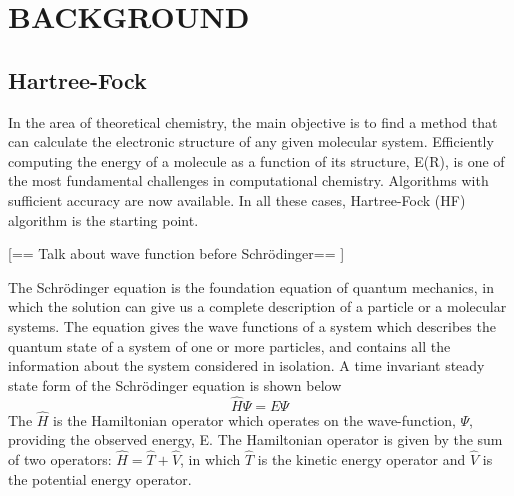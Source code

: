 \documentclass[twoside]{article}
\begin{document}

\section{BACKGROUND}

\subsection{Hartree-Fock}



In the area of theoretical chemistry, the main objective is to find a method that can calculate the electronic structure of any given molecular system. Efficiently computing the energy of a molecule as a function of its structure, E(R), is one of the most fundamental challenges in computational chemistry. Algorithms with sufficient accuracy are now available. In all these cases, Hartree-Fock (HF) algorithm is the starting point.



[== Talk about wave function before Schrödinger== ]

The Schrödinger equation is the foundation equation of quantum mechanics, in which the solution can give us a complete description of a particle or a molecular systems. The equation gives the wave functions of a system which describes the quantum state of a system of one or more particles, and contains all the information about the system considered in isolation. A time invariant steady state form of the Schrödinger equation  is shown below
\[
				\hat{H}\Psi = E\Psi
\]
The $\hat{H}$ is the Hamiltonian operator which operates on the wave-function, $\Psi$, providing the observed energy, E. The Hamiltonian operator is given by the sum of two operators: $\hat{H} = \hat{T} + \hat{V}$,  in which $\hat{T}$ is the kinetic energy operator and $\hat{V}$ is the potential energy operator.
\end{document}
